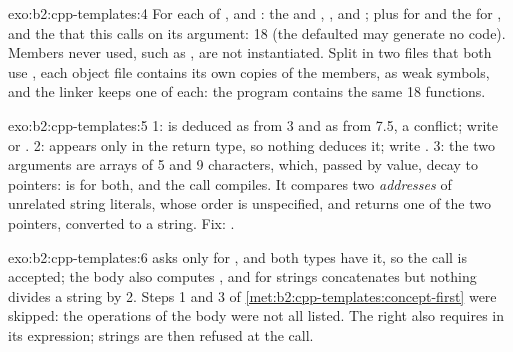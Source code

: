 \begin{solution}{exo:b2:cpp-templates:4}
For each of ,  and : the  and , ,
 and ; plus  for  and the  for
, and the   that this  calls on its
argument: 18  (the defaulted  may generate no code). Members never used,
such as , are not instantiated. Split in two files that both use , each object file
contains its own copies of the  members, as weak symbols, and the linker keeps one of each: the
program contains the same 18 functions.
\end{solution}

\begin{solution}{exo:b2:cpp-templates:5}
1:  is deduced as  from 3 and as  from 7.5, a conflict; write  or . 2:  appears only in the return type, so nothing deduces it; write
. 3: the two arguments are arrays of 5 and 9 characters, which, passed by value, decay to
pointers:  is  for both, and the call compiles. It compares two \emph{addresses} of
unrelated string literals, whose order is unspecified, and returns one of the two pointers, converted to a string.
Fix: .
\end{solution}

\begin{solution}{exo:b2:cpp-templates:6}
 asks only for \code{<}, and both types have it, so the call is accepted; the body also computes
, and for strings \code{+} concatenates but nothing divides a string by 2. Steps 1 and 3 of
\cref{met:b2:cpp-templates:concept-first} were skipped: the operations of the body were not all listed. The right
 also requires  in its  expression; strings are
then refused at the call.
\end{solution}

